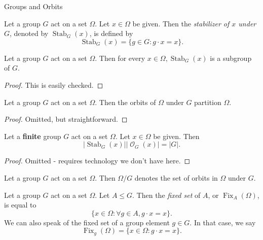 \documentclass[12pt]{pom_thesis}
\DeclareMathOperator{\fix}{Fix}
\DeclareMathOperator{\stab}{Stab}
\DeclareMathOperator{\orb}{\mathcal{O}}
\begin{document}
\begin{chapter}{Groups and Orbits}
\begin{defn}
Let a group $G$ act on a set $\Omega$. Let $x \in \Omega$ be given. Then the \emph{stabilizer of $x$ under $G$}, denoted by $\stab_G(x)$, is defined by
\[
\stab_G(x) = \{g \in G:g \cdot x = x\}.
\]
\end{defn}
\begin{thm}
Let a group $G$ act on a set $\Omega$. Then for every $x \in \Omega, \stab_G(x)$ is a subgroup of $G$.
\end{thm}
\begin{proof}
This is easily checked.
\end{proof}
\begin{thm}
Let a group $G$ act on a set $\Omega$. Then the orbits of $\Omega$ under $G$ partition $\Omega$.
\end{thm}
\begin{proof}
Omitted, but straightforward.
\end{proof}
\begin{thm}\label{fcp}
Let a \textbf{finite} group $G$ act on a set $\Omega$. Let $x \in \Omega$ be given. Then
\[
|\stab_G(x)||\orb_G(x)| = |G|.
\]
\end{thm}
\begin{proof}
Omitted - requires technology we don't have here.
\end{proof}
\begin{defn}
Let a group $G$ act on a set $\Omega$. Then $\Omega/G$ denotes the set of orbits in $\Omega$ under $G$.
\end{defn}
\begin{defn}
Let a group $G$ act on a set $\Omega$. Let $A \leq G$. Then the \emph{fixed set} of $A$, or $\fix_A(\Omega)$, is equal to
\[
\{x \in \Omega : \forall g \in A, g \cdot x = x\}.
\]
We can also speak of the fixed set of a group element $g \in G$. In that case, we say
\[
\fix_g(\Omega) = \{x \in \Omega : g \cdot x = x \}.
\]
\end{defn}


\end{chapter}
\end{document}
